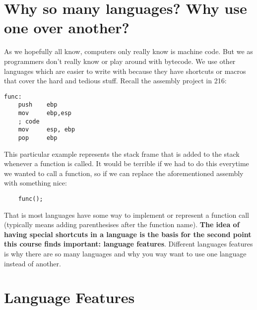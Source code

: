 \documentclass[main.tex]{subfiles}
\begin{document}
\section{Why so many languages? Why use one over another?}

As we hopefully all know, computers only really know is machine code. But we as programmers don't really know or play around with bytecode. We use other languages which are easier to write with because they have shortcuts or macros that cover the hard and tedious stuff. Recall the assembly project in 216:
\begin{verbatim}
func: 
    push    ebp     
    mov     ebp,esp
    ; code
    mov     esp, ebp
    pop     ebp
\end{verbatim}
This particular example represents the stack frame that is added to the stack whenever a function is called. It would be terrible if we had to do this everytime we wanted to call a function, so if we can replace the aforementioned assembly with something nice:
\begin{verbatim}
    func();
\end{verbatim}

That is most languages have some way to implement or represent a function call (typically means adding parenthesises after the function name). \textbf{The idea of having special shortcuts in a language is the basis for the second point this course finds important: language features}. Different languages features is why there are so many languages and why you way want to use one language instead of another. 

\section{Language Features}
\end{document}
